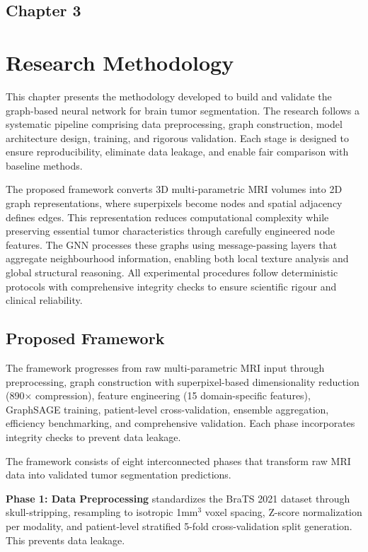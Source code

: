 \begin{center}
    \section*{\fontsize{20}{20}\selectfont Chapter 3}
\end{center}
\vspace{10mm}
\section{Research Methodology}

This chapter presents the methodology developed to build and validate the graph-based neural network for brain tumor segmentation. The research follows a systematic pipeline comprising data preprocessing, graph construction, model architecture design, training, and rigorous validation. Each stage is designed to ensure reproducibility, eliminate data leakage, and enable fair comparison with baseline methods.

The proposed framework converts 3D multi-parametric MRI volumes into 2D graph representations, where superpixels become nodes and spatial adjacency defines edges. This representation reduces computational complexity while preserving essential tumor characteristics through carefully engineered node features. The GNN processes these graphs using message-passing layers that aggregate neighbourhood information, enabling both local texture analysis and global structural reasoning. All experimental procedures follow deterministic protocols with comprehensive integrity checks to ensure scientific rigour and clinical reliability.


\subsection{Proposed Framework}

The framework progresses from raw multi-parametric MRI input through preprocessing, graph construction with superpixel-based dimensionality reduction (890× compression), feature engineering (15 domain-specific features), GraphSAGE training, patient-level cross-validation, ensemble aggregation, efficiency benchmarking, and comprehensive validation. Each phase incorporates integrity checks to prevent data leakage.

The framework consists of eight interconnected phases that transform raw MRI data into validated tumor segmentation predictions.

\textbf{Phase 1: Data Preprocessing} standardizes the BraTS 2021 dataset through skull-stripping, resampling to isotropic 1mm$^3$ voxel spacing, Z-score normalization per modality, and patient-level stratified 5-fold cross-validation split generation. This prevents data leakage.

